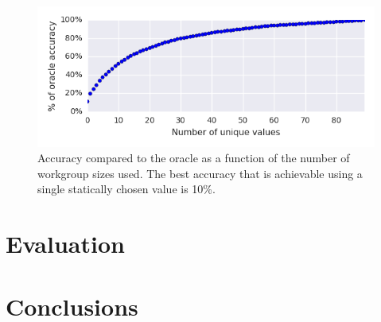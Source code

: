 \begin{figure}
\centering
\includegraphics{gen/img/num_param_oracle.png}
\caption{%
  Accuracy compared to the oracle as a function of the number of
  workgroup sizes used. The best accuracy that is achievable using a
  single statically chosen value is 10\%.%
}
\end{figure}

\section{Evaluation}


\section{Conclusions}


\clearpage
\begin{appendices}
\end{appendices}


